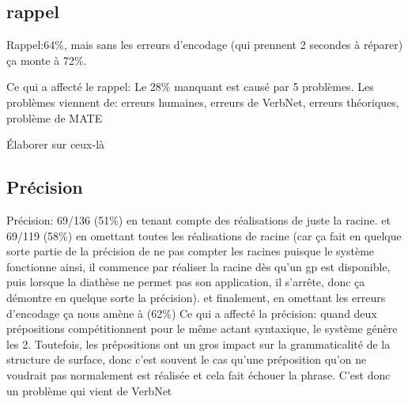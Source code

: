 \subsection{rappel}

Rappel:64\%, mais sans les erreurs d'encodage (qui prennent 2 secondes à réparer) ça monte à 72\%.

Ce qui a affecté le rappel: Le 28\% manquant est causé par 5 problèmes. Les problèmes viennent de: erreurs humaines, erreurs de VerbNet, erreurs théoriques, problème de MATE

Élaborer sur ceux-là 

\subsection{Précision}
Précision: 69/136 (51\%) en tenant compte des réalisations de juste la racine. et 69/119 (58\%) en omettant toutes les réalisations de racine (car ça fait en quelque sorte partie de la précision de ne pas compter les racines puisque le système fonctionne ainsi, il commence par réaliser la racine dès qu'un gp est disponible, puis lorsque la diathèse ne permet pas son application, il s'arrête, donc ça démontre en quelque sorte la précision). et finalement, en omettant les erreurs d'encodage ça nous amène à (62\%)
Ce qui a affecté la précision:
quand deux prépositions compétitionnent pour le même actant syntaxique, le système génère les 2. Toutefois, les prépositions ont un gros impact sur la grammaticalité de la structure de surface, donc c'est souvent le cas qu'une préposition qu'on ne voudrait pas normalement est réalisée et cela fait échouer la phrase. C'est donc un problème qui vient de VerbNet

